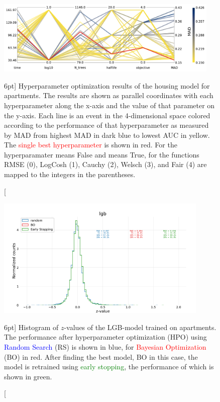 \documentclass[a4paper, twoside]{tufte-book}
\newcommand{\code}[1]{\colorbox{light-gray}{\texttt{\detokenize{#1}}}}
\begin{document}
\begin{figure}
  \includegraphics[width=0.95\textwidth, trim=0 0 0 0, clip]{figures/housing/Ejerlejlighed_v17_cut_all_Ncols_all_CV_viz_initial_HPO.pdf}
  \caption[Overview of initial hyperparamater optimization of the housing model for apartments][6pt]
          {Hyperparameter optimization results of the housing model for apartments. The results are shown as parallel coordinates with each hyperparameter along the x-axis and the value of that parameter on the y-axis. Each line is an event in the 4-dimensional space colored according to the performance of that hyperparameter as measured by MAD from \textcolor{viridis-dark}{highest} MAD in dark blue to \textcolor{viridis-light}{lowest} AUC in yellow. The \textcolor{red}{single best hyperparameter} is shown in red. For the hyperparamater \code{log10} \code{0} means False and \code{1} means True, for \code{objektive} the functions RMSE (0), LogCosh (1), Cauchy (2), Welsch (3), and Fair (4) are mapped to the integers in the parentheses.   
          } 
  \label{fig:h:CV_res_parallel_coords}
\end{figure}



\begin{figure}
  \includegraphics[width=0.9\textwidth, trim=0 0 0 70, clip]{figures/housing/Ejerlejlighed_v17_cut_all_Ncols_all_lgb_z_hist_metrics.pdf}
  \caption[Performance of LGB-model on apartment prices][6pt]
          {Histogram of $z$-values of the LGB-model trained on apartments. The performance after hyperparameter optimization (HPO) using \textcolor{blue}{Random Search} (RS) is shown in blue, for \textcolor{red}{Bayesian Optimization} (BO) in red. After finding the best model, BO in this case, the model is retrained using \textcolor{green}{early stopping}, the performance of which is shown in green.}
  \label{fig:h:performance_lgb}
\end{figure}
\end{document}
